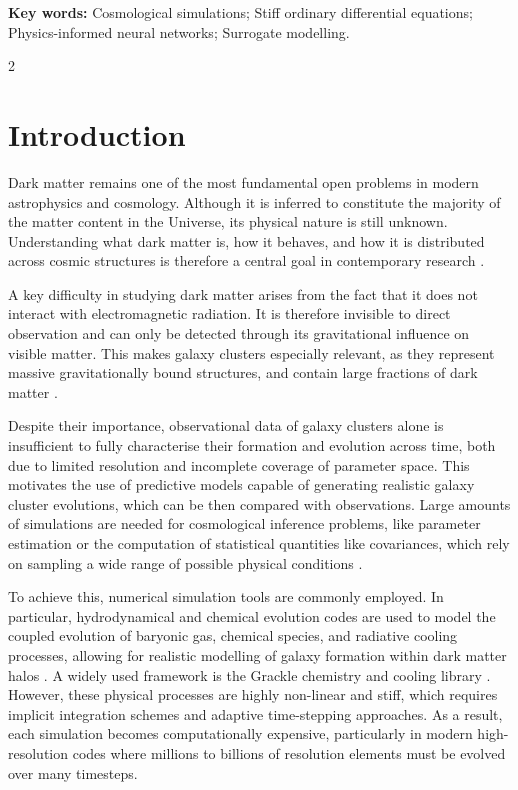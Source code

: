\documentclass[10pt,a4paper]{article}
\begin{document}
\textbf{Key words:} Cosmological simulations; Stiff ordinary differential equations; Physics-informed neural networks; Surrogate modelling.
\vspace{1.5cm}

\begin{multicols}{2}

\section{Introduction}

Dark matter remains one of the most fundamental open problems in modern astrophysics and cosmology. Although it is inferred to constitute the majority of the matter content in the Universe, its physical nature is still unknown. Understanding what dark matter is, how it behaves, and how it is distributed across cosmic structures is therefore a central goal in contemporary research \cite{taylor2010}.

A key difficulty in studying dark matter arises from the fact that it does not interact with electromagnetic radiation. It is therefore invisible to direct observation and can only be detected through its gravitational influence on visible matter. This makes galaxy clusters especially relevant, as they represent massive gravitationally bound structures, and contain large fractions of dark matter \cite{kravtsov2012formation}.

Despite their importance, observational data of galaxy clusters alone is insufficient to fully characterise their formation and evolution across time, both due to limited resolution and incomplete coverage of parameter space. This motivates the use of predictive models capable of generating realistic galaxy cluster evolutions, which can be then compared with observations. Large amounts of simulations are needed for cosmological inference problems, like parameter estimation or the computation of statistical quantities like covariances, which rely on sampling a wide range of possible physical conditions \cite{schaye2023flamingo, wu2015rhapsody, harvey2025darkskies}.

To achieve this, numerical simulation tools are commonly employed. In particular, hydrodynamical and chemical evolution codes are used to model the coupled evolution of baryonic gas, chemical species, and radiative cooling processes, allowing for realistic modelling of galaxy formation within dark matter halos \cite{kere2009}. A widely used framework is the Grackle chemistry and cooling library \cite{smith2017grackle}.  However, these physical processes are highly non-linear and stiff, which requires implicit integration schemes and adaptive time-stepping approaches. As a result, each simulation becomes computationally expensive, particularly in modern high-resolution codes where millions to billions of resolution elements must be evolved over many timesteps.



\end{multicols}
\end{document}
